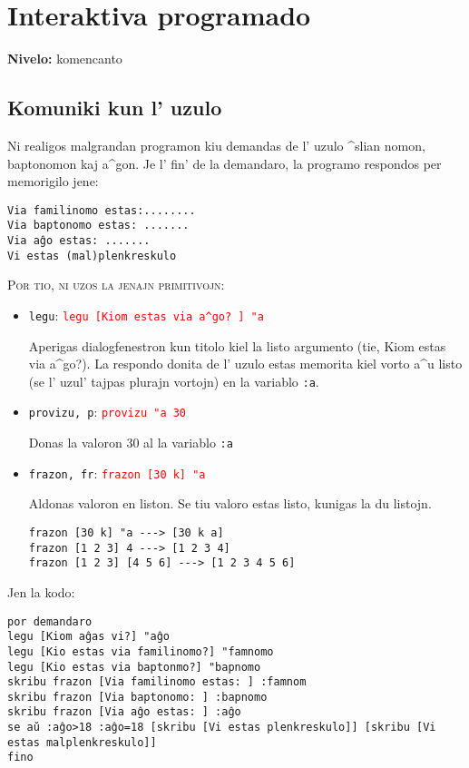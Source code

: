 \chapter{Interaktiva programado}
\label{interaktiva}

{ }\hfill\textbf{Nivelo:} komencanto
\section{Komuniki kun l' uzulo}

Ni realigos malgrandan programon kiu demandas de l' uzulo ^slian
nomon, baptonomon kaj a^gon.  Je l' fin' de la demandaro, la programo
respondos per memorigilo jene:
\begin{verbatim}
Via familinomo estas:........
Via baptonomo estas: .......
Via aĝo estas: .......
Vi estas (mal)plenkreskulo
\end{verbatim}
\textsc{Por tio, ni uzos la jenajn primitivojn:}
\begin{itemize}
\item \texttt{legu}:\hspace{4cm}  \textcolor{red}{ \texttt{legu [Kiom estas via a^go? ] "a}}

  Aperigas dialogfenestron kun titolo kiel la listo argumento (tie,
  \og Kiom estas via a^go?\fg). La respondo donita de l' uzulo estas
  memorita kiel vorto a^u listo (se l' uzul' tajpas plurajn
  vortojn) en la variablo \texttt{:a}.

\item \texttt{provizu, p}:\hspace{4cm}  \textcolor{red}{ \texttt{provizu "a 30}}

  Donas la valoron $30$ al la variablo \texttt{:a}

\item \texttt{frazon, fr}:\hspace{4cm}  \textcolor{red}{ \texttt{frazon [30 k] "a }}

  Aldonas valoron en liston.  Se tiu valoro estas listo, kunigas la du listojn.

\begin{verbatim}
frazon [30 k] "a ---> [30 k a]
frazon [1 2 3] 4 ---> [1 2 3 4]
frazon [1 2 3] [4 5 6] ---> [1 2 3 4 5 6]
\end{verbatim} 
\end{itemize}
Jen la kodo:
\begin{verbatim}
por demandaro
legu [Kiom aĝas vi?] "aĝo
legu [Kio estas via familinomo?] "famnomo
legu [Kio estas via baptonmo?] "bapnomo
skribu frazon [Via familinomo estas: ] :famnom
skribu frazon [Via baptonomo: ] :bapnomo
skribu frazon [Via aĝo estas: ] :aĝo
se aŭ :aĝo>18 :aĝo=18 [skribu [Vi estas plenkreskulo]] [skribu [Vi estas malplenkreskulo]]
fino
\end{verbatim}

